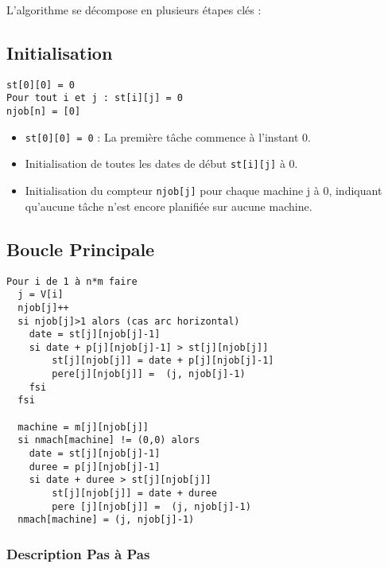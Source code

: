 \documentclass[12pt]{article}
\begin{document}
L'algorithme se décompose en plusieurs étapes clés :

\subsection{Initialisation}

\begin{verbatim}
st[0][0] = 0
Pour tout i et j : st[i][j] = 0
njob[n] = [0]
\end{verbatim}

\begin{itemize}
    \item \texttt{st[0][0] = 0} : La première tâche commence à l'instant 0.
    \item Initialisation de toutes les dates de début \texttt{st[i][j]} à 0.
    \item Initialisation du compteur \texttt{njob[j]} pour chaque machine j à 0, indiquant qu'aucune tâche n'est encore planifiée sur aucune machine.
\end{itemize}

\subsection{Boucle Principale}

\begin{verbatim}
Pour i de 1 à n*m faire 
  j = V[i]
  njob[j]++ 
  si njob[j]>1 alors (cas arc horizontal)
    date = st[j][njob[j]-1]
    si date + p[j][njob[j]-1] > st[j][njob[j]]
        st[j][njob[j]] = date + p[j][njob[j]-1]
        pere[j][njob[j]] =  (j, njob[j]-1)
    fsi 
  fsi 
  
  machine = m[j][njob[j]]
  si nmach[machine] != (0,0) alors 
    date = st[j][njob[j]-1]
    duree = p[j][njob[j]-1]
    si date + duree > st[j][njob[j]]
        st[j][njob[j]] = date + duree
        pere [j][njob[j]] =  (j, njob[j]-1)
  nmach[machine] = (j, njob[j]-1)
\end{verbatim}

\subsubsection{Description Pas à Pas}
\end{document}
